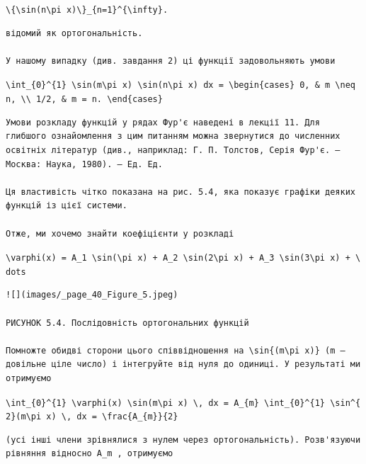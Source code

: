 \documentclass[
  ukrainian,
]{article}
\begin{document}
\texttt{\textbackslash{}\{\textbackslash{}sin(n\textbackslash{}pi\ x)\textbackslash{}\}\_\{n=1\}\^{}\{\textbackslash{}infty\}.}

\begin{verbatim}
відомий як ортогональність.

У нашому випадку (див. завдання 2) ці функції задовольняють умови
\end{verbatim}

\texttt{\textbackslash{}int\_\{0\}\^{}\{1\}\ \textbackslash{}sin(m\textbackslash{}pi\ x)\ \textbackslash{}sin(n\textbackslash{}pi\ x)\ dx\ =\ \textbackslash{}begin\{cases\}\ 0,\ \&\ m\ \textbackslash{}neq\ n,\ \textbackslash{}\textbackslash{}\ 1/2,\ \&\ m\ =\ n.\ \textbackslash{}end\{cases\}}

\begin{verbatim}
Умови розкладу функцій у рядах Фур'є наведені в лекції 11. Для глибшого ознайомлення з цим питанням можна звернутися до численних освітніх літератур (див., наприклад: Г. П. Толстов, Серія Фур'є. — Москва: Наука, 1980). — Ед. Ед.

Ця властивість чітко показана на рис. 5.4, яка показує графіки деяких функцій із цієї системи.

Отже, ми хочемо знайти коефіцієнти у розкладі
\end{verbatim}

\texttt{\textbackslash{}varphi(x)\ =\ A\_1\ \textbackslash{}sin(\textbackslash{}pi\ x)\ +\ A\_2\ \textbackslash{}sin(2\textbackslash{}pi\ x)\ +\ A\_3\ \textbackslash{}sin(3\textbackslash{}pi\ x)\ +\ \textbackslash{}dots}

\begin{verbatim}
![](images/_page_40_Figure_5.jpeg)

РИСУНОК 5.4. Послідовність ортогональних функцій

Помножте обидві сторони цього співвідношення на \sin{(m\pi x)} (m — довільне ціле число) і інтегруйте від нуля до одиниці. У результаті ми отримуємо
\end{verbatim}

\texttt{\textbackslash{}int\_\{0\}\^{}\{1\}\ \textbackslash{}varphi(x)\ \textbackslash{}sin(m\textbackslash{}pi\ x)\ \textbackslash{},\ dx\ =\ A\_\{m\}\ \textbackslash{}int\_\{0\}\^{}\{1\}\ \textbackslash{}sin\^{}\{2\}(m\textbackslash{}pi\ x)\ \textbackslash{},\ dx\ =\ \textbackslash{}frac\{A\_\{m\}\}\{2\}}

\begin{verbatim}
(усі інші члени зрівнялися з нулем через ортогональність). Розв'язуючи рівняння відносно A_m , отримуємо
\end{verbatim}
\end{document}
